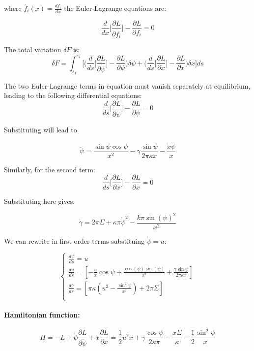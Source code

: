 \documentclass[12pt]{article}
\begin{document}
where $\dot{f_i}(x)=\frac{df_i}{dx}$ the Euler-Lagrange equations are:

$$
\frac{d}{dx}\bigg[ \frac{\partial L}{\partial \dot{f_i}} \bigg] - \frac{\partial L}{\partial f_i} = 0
$$

The total variation $\delta F$ is:
 $$
 \delta F = \int_{s_1}^{s_2} \bigg[ \bigg(  \frac{d}{ds}\bigg[ \frac{\partial L}{\partial \dot{\psi}} \bigg] - \frac{\partial L}{\partial \psi} \bigg)\delta \psi + \bigg(  \frac{d}{ds}\bigg[ \frac{\partial L}{\partial \dot{x}} \bigg] - \frac{\partial L}{\partial x} \bigg)\delta x \bigg] ds 
 $$


The two Euler-Lagrange terms in equation must vanish separately at equilibrium, leading to the following differential equations:
 $$
 \frac{d}{ds}\bigg[ \frac{\partial L}{\partial \dot{\psi}} \bigg] - \frac{\partial L}{\partial \psi}  = 0
 $$

Substituting will lead to 

$$
\ddot{\psi} = \frac{\sin \psi \cos \psi}{x^2} - \gamma \frac{\sin \psi}{2 \pi \kappa x} - \frac{\dot{x} \dot{\psi}}{x}
$$

Similarly, for the second term:
$$
\frac{d}{ds}\bigg[ \frac{\partial L}{\partial \dot{x}} \bigg] - \frac{\partial L}{\partial x} = 0
$$

Substituting here gives: 

$$
\dot{\gamma} = 2 \pi \Sigma + \kappa \pi \dot{\psi}^2 - \frac{k \pi \sin(\psi)^2}{x^2}
$$

We can rewrite in first order terms substituing $\dot{\psi} =u$: 

\begin{equation}
  \begin{cases} 
    \frac{d\psi}{ds} =  u \\[3mm]
    \frac{du}{ds} =  [-\frac{u}{x}\cos\psi+\frac{\cos(\psi)\sin(\psi)}{x^2}+\frac{\gamma\sin \psi}{2\pi \kappa x}] \\[3mm]
    \frac{d\gamma}{ds} =  [\pi \kappa (u^2-\frac{\sin^2 \psi}{x^2})+2 \pi \Sigma] \\[3mm]
  \end{cases}
\end{equation}


\paragraph*{Hamiltonian function:}

\begin{equation*}
  H = -L + \dot{\psi} \frac{\partial L}{\partial \dot{\psi}} + \dot{x} \frac{\partial L}{\partial \dot{x}}
  = \frac{1}{2} u^2 x +  \gamma \frac{\cos \psi}{2 \kappa \pi} - \frac{x \Sigma}{\kappa} - \frac{1}{2} \frac{\sin^2 \psi}{x}
\end{equation*}
\end{document}
